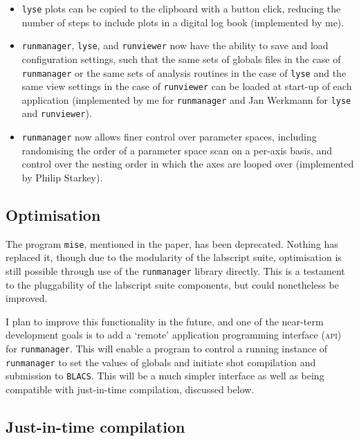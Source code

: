 \begin{itemize}
    \item \texttt{lyse} plots can be copied to the clipboard with a button click, reducing the number of steps to include plots in a digital log book (implemented by me).
    
    \item \texttt{runmanager}, \texttt{lyse}, and \texttt{runviewer} now have the ability to save and load configuration settings, such that the same sets of globals files in the case of \texttt{runmanager} or the same sets of analysis routines in the case of \texttt{lyse} and the same view settings in the case of \texttt{runviewer} can be loaded at start-up of each application (implemented by me for \texttt{runmanager} and Jan Werkmann for \texttt{lyse} and \texttt{runviewer}).
    
    \item \texttt{runmanager} now allows finer control over parameter spaces, including randomising the order of a parameter space scan on a per-axis basis, and control over the nesting order in which the axes are looped over (implemented by Philip Starkey).
\end{itemize}

\subsection{Optimisation}

The program \texttt{mise}, mentioned in the paper, has been deprecated. Nothing has replaced it, though due to the modularity of the labscript suite, optimisation is still possible through use of the \texttt{runmanager} library directly. This is a testament to the pluggability of the labscript suite components, but could nonetheless be improved.

I plan to improve this functionality in the future, and one of the near-term development goals is to add a `remote' application programming interface (\textsc{api}) for \texttt{runmanager}. This will enable a program to control a running instance of \texttt{runmanager} to set the values of globals and initiate shot compilation and submission to \texttt{BLACS}. This will be a much simpler interface as well as being compatible with just-in-time compilation, discussed below.

\subsection{Just-in-time compilation}\label{sec:jit}

